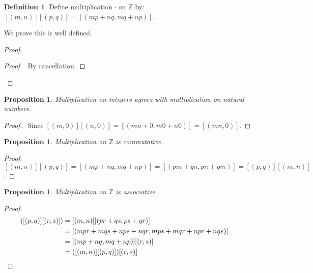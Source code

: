 \documentclass{book}
\let\qed\relax
\newtheorem{prop}[ax]{Proposition}
\theoremstyle{definition}
\newtheorem{df}[ax]{Definition}
\begin{document}
\begin{df}
Define multiplication $\cdot$ on $\mathbb{Z}$ by: $[(m,n)][(p,q)] = [(mp+nq,mq+np)]$.

We prove this is well defined.
\end{df}

\begin{proof}
\pf
{}
\begin{proof}
	\pf\ By cancellation.
\end{proof}
\qed
\end{proof}

\begin{prop}
Multiplication on integers agrees with multiplication on natural numbers.
\end{prop}

\begin{proof}
\pf\ Since $[(m,0)][(n,0)] = [(mn+0,m0+n0)] = [(mn,0)]$. \qed
\end{proof}

\begin{prop}
\label{prop:timesZcomm}
Multiplication on $\mathbb{Z}$ is commutative.
\end{prop}

\begin{proof}
\pf\ $[(m,n)][(p,q)] = [(mp+nq,mq+np)] = [(pm+qn,pn+qm)] = [(p,q)][(m,n)]$. \qed
\end{proof}

\begin{prop}
\label{prop:timesZassoc}
Multiplication on $\mathbb{Z}$ is associative.
\end{prop}

\begin{proof}
\pf
\begin{align*}
[(m,n)]([(p,q)][(r,s)]) & = [(m,n)][(pr+qs,ps+qr)] \\
& = [(mpr+mqs+nps+nqr,mps+mqr+npr+nqs)] \\
& = [(mp+nq,mq+np)][(r,s)] \\
& = ([(m,n)][(p,q)])[(r,s)] & \qed
\end{align*}
\end{proof}
\end{document}
